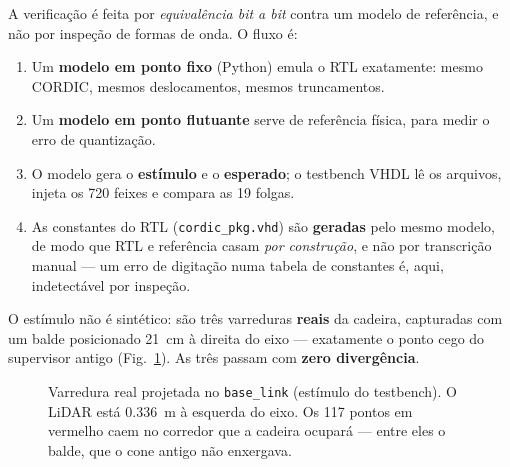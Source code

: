 \documentclass[conference]{IEEEtran}
\begin{document}
A verifica\c{c}\~ao \'e feita por \emph{equival\^encia bit a bit} contra um modelo
de refer\^encia, e n\~ao por inspe\c{c}\~ao de formas de onda. O fluxo \'e:

\begin{enumerate}
\item Um \textbf{modelo em ponto fixo} (Python) emula o RTL exatamente: mesmo
CORDIC, mesmos deslocamentos, mesmos truncamentos.
\item Um \textbf{modelo em ponto flutuante} serve de refer\^encia f\'isica, para
medir o erro de quantiza\c{c}\~ao.
\item O modelo gera o \textbf{est\'imulo} e o \textbf{esperado}; o testbench VHDL
l\^e os arquivos, injeta os \num{720} feixes e compara as \num{19} folgas.
\item As constantes do RTL (\texttt{cordic\_pkg.vhd}) s\~ao \textbf{geradas} pelo
mesmo modelo, de modo que RTL e refer\^encia casam \emph{por constru\c{c}\~ao}, e
n\~ao por transcri\c{c}\~ao manual --- um erro de digita\c{c}\~ao numa tabela de
constantes \'e, aqui, indetect\'avel por inspe\c{c}\~ao.
\end{enumerate}

O est\'imulo n\~ao \'e sint\'etico: s\~ao tr\^es varreduras \textbf{reais} da
cadeira, capturadas com um balde posicionado \SI{21}{\centi\metre} \`a direita do
eixo --- exatamente o ponto cego do supervisor antigo (Fig.~\ref{fig:corredor}).
As tr\^es passam com \textbf{zero diverg\^encia}.

\begin{figure}[!t]
\centering
{}
\caption{Varredura real projetada no \texttt{base\_link} (est\'imulo do
testbench). O LiDAR est\'a \SI{0.336}{\metre} \`a esquerda do eixo. Os
\num{117} pontos em vermelho caem no corredor que a cadeira ocupar\'a --- entre
eles o balde, que o cone antigo n\~ao enxergava.}
\label{fig:corredor}
\end{figure}
\end{document}
